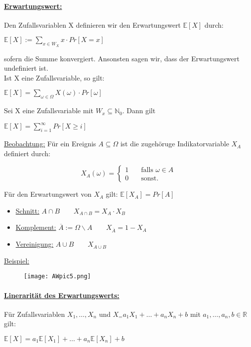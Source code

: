 \documentclass[8pt]{extreport}
\begin{document}
\paragraph{\underline{Erwartungswert:}} Den Zufallsvariablen X definieren wir den Erwartungswert $\mathbb{E}[X]$ durch:
\begin{center}
$\mathbb{E}[X]:= \displaystyle\sum_{x \in W_X} x \cdot Pr[X = x]$
\end{center}
sofern die Summe konvergiert. Ansonsten sagen wir, dass der Erwartungswert undefiniert ist.\\
Ist X eine Zufallsvariable, so gilt:
\begin{center}
$\mathbb{E}[X] = \displaystyle\sum_{\omega \in \Omega} X(\omega) \cdot Pr[\omega]$
\end{center}
Sei X eine Zufallsvariable mit $W_x \subseteq \mathbb{N}_0$. Dann gilt
\begin{center}
$\mathbb{E}[X] = \displaystyle\sum_{i=1}^{\infty}Pr[X \geq i]$
\end{center}
\underline{Beobachtung:} Für ein Ereignis $A \subseteq \Omega$ ist die zugehöruge Indikatorvariable $X_A$ definiert durch:
\begin{center}
 \[ X_A(\omega) =
  \begin{cases}
    1       & \quad \text{falls } \omega \in A\\
    0  & \quad \text{sonst. }
  \end{cases}
\] 
\end{center}
Für den Erwartungswert von $X_A$ gilt: $\mathbb{E}[X_A] = Pr[A]$\\
\begin{itemize}
\item \underline{Schnitt:} $A \cap B \qquad X_{A\cap B} = X_A \cdot X_B$
\item \underline{Komplement:} $\overline{A}:= \Omega \backslash A \qquad X_{\overline{A}} = 1 - X_A$
\item \underline{Vereinigung:} $A \cup B \qquad X_{A\cup B}$
\end{itemize}
\underline{Beispiel:}
\begin{figure}[h!]
	\centering\texttt{[image: AWpic5.png]}
	\caption{}
	\label{beispiel5}
\end{figure}
\paragraph{\underline{Linerarität des Erwartungswerts:}} Für Zufallsvariablen $X_1, \dots, X_n$ und $ X_= a_1X_1 + \dots + a_nX_n + b$ mit $a_1,\dots,a_n, b \in \mathbb{R}$ gilt:
\begin{center}
$\mathbb{E}[X] = a_1\mathbb{E}[X_1] + \dots + a_n\mathbb{E}[X_n] + b$
\end{center}
\end{document}
